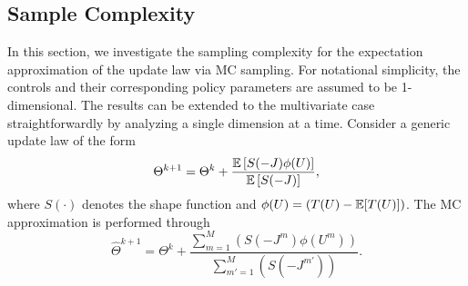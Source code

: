 \documentclass[twoside,11pt]{article}
\begin{document}
\subsection{Sample Complexity}
\label{sec: complexity}
In this section, we investigate the sampling complexity for the expectation approximation of the update law via \ac{MC} sampling. For notational simplicity, the controls and their corresponding policy parameters are assumed to be 1-dimensional. The results can be extended to the multivariate case straightforwardly by analyzing a single dimension at a time. Consider a generic update law of the form
\begin{equation} \label{eq: policy_update_true}
\Theta^{k+1} = \Theta^k + \frac{\mathbb{E}\left[S(-J)\phi(U)\right]}{\mathbb{E}\left[S(-J)\right]},
\end{equation}
where $S(\cdot)$ denotes the shape function and $\phi(U)=(T(U)-\mathbb{E}[T(U)])$. The \ac{MC} approximation is performed through
\begin{equation} \label{eq: policy_update_approx}
\hat{\Theta}^{k+1} = \Theta^k + \frac{\sum^M_{m=1}\left(S(-J^m)\phi(U^m)\right)}{\sum^M_{m'=1}\left(S(-J^{m'})\right)}.
\end{equation}
\end{document}

